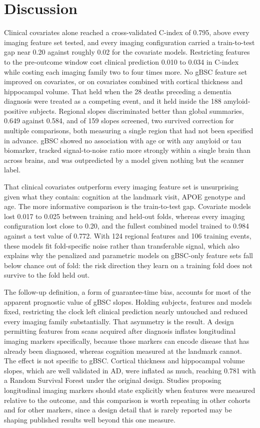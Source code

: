 \documentclass[blue]{ludusofficial}  %
\begin{document}
\section{Discussion}

Clinical covariates alone reached a cross-validated C-index of 0.795, above every imaging feature set tested, and every imaging configuration carried a train-to-test gap near 0.20 against roughly 0.02 for the covariate models. Restricting features to the pre-outcome window cost clinical prediction 0.010 to 0.034 in C-index while costing each imaging family two to four times more. No gBSC feature set improved on covariates, or on covariates combined with cortical thickness and hippocampal volume. That held when the 28 deaths preceding a dementia diagnosis were treated as a competing event, and it held inside the 188 amyloid-positive subjects. Regional slopes discriminated better than global summaries, 0.649 against 0.584, and of 159 slopes screened, two survived correction for multiple comparisons, both measuring a single region that had not been specified in advance. gBSC showed no association with age or with any amyloid or tau biomarker, tracked signal-to-noise ratio more strongly within a single brain than across brains, and was outpredicted by a model given nothing but the scanner label.

That clinical covariates outperform every imaging feature set is unsurprising given what they contain: cognition at the landmark visit, APOE genotype and age. The more informative comparison is the train-to-test gap. Covariate models lost 0.017 to 0.025 between training and held-out folds, whereas every imaging configuration lost close to 0.20, and the fullest combined model trained to 0.984 against a test value of 0.772. With 124 regional features and 106 training events, these models fit fold-specific noise rather than transferable signal, which also explains why the penalized and parametric models on gBSC-only feature sets fall below chance out of fold: the risk direction they learn on a training fold does not survive to the fold held out.

The follow-up definition, a form of guarantee-time bias, accounts for most of the apparent prognostic value of gBSC slopes. Holding subjects, features and models fixed, restricting the clock left clinical prediction nearly untouched and reduced every imaging family substantially. That asymmetry is the result. A design permitting features from scans acquired after diagnosis inflates longitudinal imaging markers specifically, because those markers can encode disease that has already been diagnosed, whereas cognition measured at the landmark cannot. The effect is not specific to gBSC. Cortical thickness and hippocampal volume slopes, which are well validated in AD, were inflated as much, reaching 0.781 with a Random Survival Forest under the original design. Studies proposing longitudinal imaging markers should state explicitly when features were measured relative to the outcome, and this comparison is worth repeating in other cohorts and for other markers, since a design detail that is rarely reported may be shaping published results well beyond this one measure.
\end{document}
